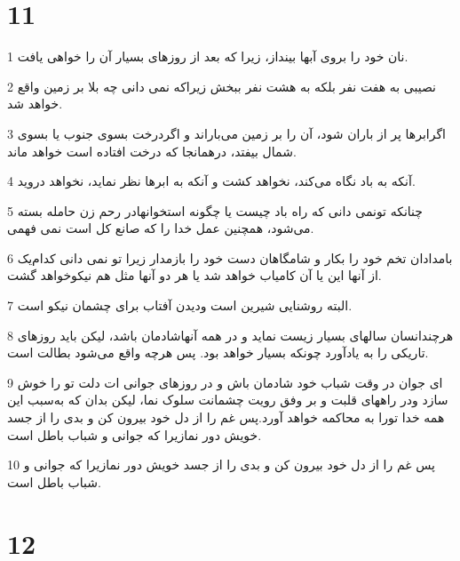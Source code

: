 \chapter{11}

\par 1 نان خود را بروی آبها بینداز، زیرا که بعد از روزهای بسیار آن را خواهی یافت.
\par 2 نصیبی به هفت نفر بلکه به هشت نفر ببخش زیراکه نمی دانی چه بلا بر زمین واقع خواهد شد.
\par 3 اگرابرها پر از باران شود، آن را بر زمین می‌باراند و اگردرخت بسوی جنوب یا بسوی شمال بیفتد، درهمانجا که درخت افتاده است خواهد ماند.
\par 4 آنکه به باد نگاه می‌کند، نخواهد کشت و آنکه به ابرها نظر نماید، نخواهد دروید.
\par 5 چنانکه تونمی دانی که راه باد چیست یا چگونه استخوانهادر رحم زن حامله بسته می‌شود، همچنین عمل خدا را که صانع کل است نمی فهمی.
\par 6 بامدادان تخم خود را بکار و شامگاهان دست خود را بازمدار زیرا تو نمی دانی کدام‌یک از آنها این یا آن کامیاب خواهد شد یا هر دو آنها مثل هم نیکوخواهد گشت.
\par 7 البته روشنایی شیرین است ودیدن آفتاب برای چشمان نیکو است.
\par 8 هر‌چندانسان سالهای بسیار زیست نماید و در همه آنهاشادمان باشد، لیکن باید روزهای تاریکی را به یادآورد چونکه بسیار خواهد بود. پس هر‌چه واقع می‌شود بطالت است.
\par 9 ‌ای جوان در وقت شباب خود شادمان باش و در روزهای جوانی ات دلت تو را خوش سازد ودر راههای قلبت و بر وفق رویت چشمانت سلوک نما، لیکن بدان که به‌سبب این همه خدا تورا به محاکمه خواهد آورد.پس غم را از دل خود بیرون کن و بدی را از جسد خویش دور نمازیرا که جوانی و شباب باطل است.
\par 10 پس غم را از دل خود بیرون کن و بدی را از جسد خویش دور نمازیرا که جوانی و شباب باطل است.
 
\chapter{12}


